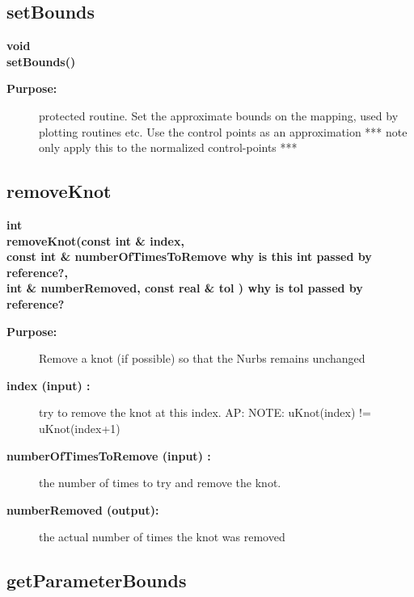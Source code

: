 \subsection{setBounds}
 
\begin{flushleft} \textbf{%
void  \\ 
\settowidth{\NurbsMappingIncludeArgIndent}{setBounds(}%
setBounds()
}\end{flushleft}
\begin{description}
\item[{\bf Purpose:}]  protected routine. Set the approximate bounds on the mapping, used by plotting routines etc.
 Use the control points as an approximation
 *** note only apply this to the normalized control-points ***
\end{description}
\subsection{removeKnot}
 
\begin{flushleft} \textbf{%
int  \\ 
\settowidth{\NurbsMappingIncludeArgIndent}{removeKnot(}%
removeKnot(const int \& index, \\ 
\hspace{\NurbsMappingIncludeArgIndent}const int \& numberOfTimesToRemove why is this int passed by reference?,\\ 
\hspace{\NurbsMappingIncludeArgIndent}int \&  numberRemoved, const real \& tol  ) why is tol passed by reference?\\ 
}\end{flushleft}
\begin{description}
\item[{\bf Purpose:}]  Remove a knot (if possible) so that the Nurbs remains unchanged
\item[{\bf index (input) :}]  try to remove the knot at this index. AP: NOTE: uKnot(index) != uKnot(index+1)
\item[{\bf numberOfTimesToRemove (input) :}]  the number of times to try and remove the knot. 
\item[{\bf numberRemoved (output):}]   the actual number of times the knot was removed
\end{description}
\subsection{getParameterBounds}
 
